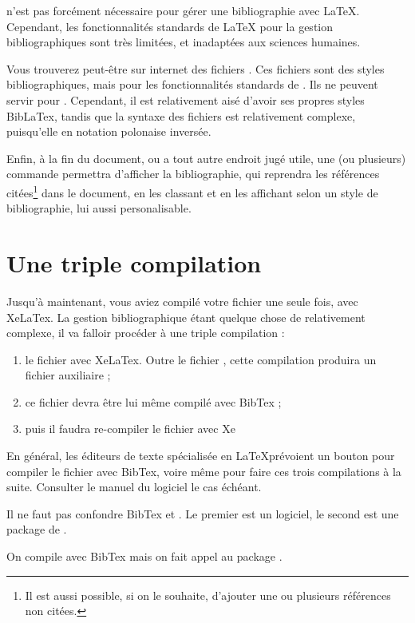 \begin{anedocte}
 n'est pas forcément nécessaire pour gérer une bibliographie avec \LaTeX. Cependant, les fonctionnalités standards de LaTeX pour la gestion bibliographiques sont très limitées, et inadaptées aux sciences humaines. 

Vous trouverez peut-être sur internet des fichiers . Ces fichiers sont des styles bibliographiques, mais pour les fonctionnalités standards de \LaTex. Ils ne peuvent servir pour . Cependant, il est relativement aisé d'avoir ses propres styles BibLaTex, tandis que la syntaxe des fichiers  est relativement complexe, puisqu'elle en notation polonaise inversée.
\end{anedocte}

Enfin, à la fin du document, ou a tout autre endroit jugé utile, une (ou plusieurs) commande permettra d'afficher la bibliographie, qui reprendra les références citées\footnote{Il est aussi possible, si on le souhaite, d'ajouter une ou plusieurs références non citées.} dans le document, en les classant et en les affichant selon un style de bibliographie, lui aussi personalisable.

\section{Une triple compilation}

Jusqu'à maintenant, vous aviez compilé votre fichier  une seule fois, avec XeLaTex. La gestion bibliographique étant quelque chose de relativement complexe, il va falloir procéder à une triple compilation :
\begin{enumerate}
\item le fichier  avec XeLaTex. Outre le fichier , cette compilation produira un fichier auxiliaire  ;
\item ce fichier devra être lui même compilé avec BibTex ;
\item puis il faudra re-compiler le fichier  avec Xe\LaTex
\end{enumerate}

En général, les éditeurs de texte spécialisée en \LaTeX prévoient un bouton pour compiler le fichier  avec BibTex, voire même pour faire ces trois compilations à la suite. Consulter le manuel du logiciel le cas échéant.

\begin{attention}
Il ne faut pas confondre BibTex et . Le premier est un logiciel, le second est une package de \LaTex.

On compile avec BibTex mais on fait appel au package .

\end{attention}



 





